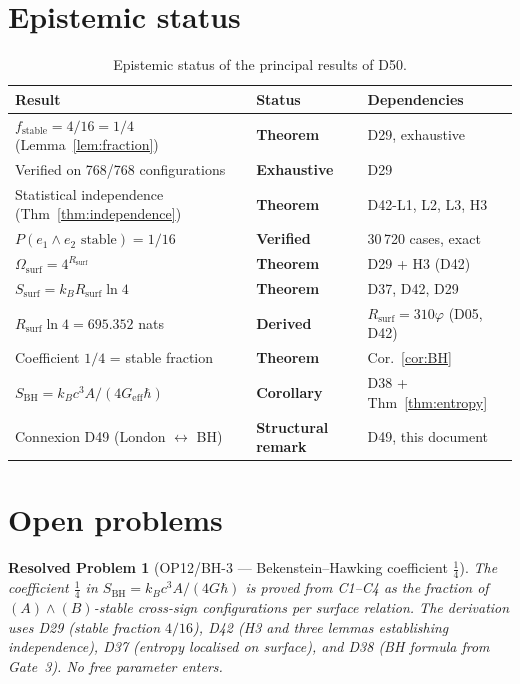 \documentclass[12pt,a4paper]{article}
\newtheorem{resolvedproblem}{Resolved Problem}
\newcommand{\hb}{\hbar}
\newcommand{\Rsurf}{R_{\mathrm{surf}}}
\newcommand{\Omegasurf}{\Omega_{\mathrm{surf}}}
\newcommand{\Ssurf}{S_{\mathrm{surf}}}
\newcommand{\SBH}{S_{\mathrm{BH}}}
\newcommand{\vp}{\varphi}
\begin{document}
\section{Epistemic status}
\label{sec:epistemic}

\begin{table}[H]
\centering
\caption{Epistemic status of the principal results of D50.}
\label{tab:epistemic}
\small
\begin{tabular}{p{6.5cm}p{3.5cm}p{3.5cm}}
\toprule
Result & Status & Dependencies \\
\midrule
$f_{\mathrm{stable}} = 4/16 = 1/4$ (Lemma~\ref{lem:fraction}) & \textbf{Theorem} & D29, exhaustive \\
Verified on 768/768 configurations & \textbf{Exhaustive} & D29 \\
Statistical independence (Thm~\ref{thm:independence}) & \textbf{Theorem} & D42-L1, L2, L3, H3 \\
$P(e_1 \wedge e_2 \text{ stable}) = 1/16$ & \textbf{Verified} & 30\,720 cases, exact \\
$\Omegasurf = 4^{\Rsurf}$ & \textbf{Theorem} & D29 + H3 (D42) \\
$\Ssurf = k_B\Rsurf\ln 4$ & \textbf{Theorem} & D37, D42, D29 \\
$\Rsurf\ln 4 = 695.352$ nats & \textbf{Derived} & $\Rsurf = 310\vp$ (D05, D42) \\
Coefficient $1/4$ = stable fraction & \textbf{Theorem} & Cor.~\ref{cor:BH} \\
$\SBH = k_B c^3 A/(4G_{\mathrm{eff}}\hb)$ & \textbf{Corollary} & D38 + Thm~\ref{thm:entropy} \\
\midrule
Connexion D49 (London $\leftrightarrow$ BH) & \textbf{Structural remark} & D49, this document \\
\bottomrule
\end{tabular}
\end{table}

\section{Open problems}
\label{sec:open}

\begin{resolvedproblem}[OP12/BH-3 --- Bekenstein--Hawking coefficient $\tfrac{1}{4}$]
The coefficient $\tfrac{1}{4}$ in $\SBH = k_B c^3 A/(4G\hbar)$ is proved from C1--C4 as the fraction of $(A)\wedge(B)$-stable cross-sign configurations per surface relation. The derivation uses D29 (stable fraction $4/16$), D42 (H3 and three lemmas establishing independence), D37 (entropy localised on surface), and D38 (BH formula from Gate~3). No free parameter enters.
\end{resolvedproblem}
\end{document}
